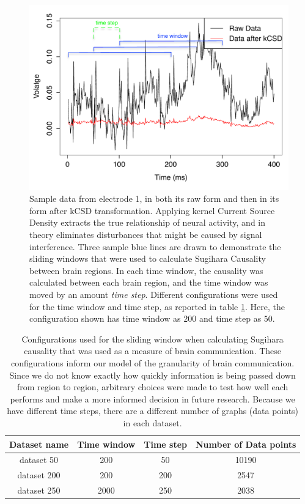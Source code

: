 \begin{figure}[H]
  \includegraphics[width=\linewidth]{figures/sample_eeg_signal_with_kcsd_edited.pdf}
  \caption{Sample data from electrode 1, in both its raw form and then in its form after kCSD transformation. Applying kernel Current Source Density extracts the true relationship of neural activity, and in theory eliminates disturbances that might be caused by signal interference. Three sample blue lines are drawn to demonstrate the sliding windows that were used to calculate Sugihara Causality between brain regions. In each time window, the causality was calculated between each brain region, and the time window was moved by an amount \textit{time step}. Different configurations were used for the time window and time step, as reported in table \ref{tab:sliding_window_configuration}. Here, the configuration shown has time window as $200$ and time step as $50$.}
  \label{fig:example_eeg_and_kcsd}
\end{figure}

\begin{table}[H]
\centering
\caption{Configurations used for the sliding window when calculating Sugihara causality that was used as a measure of brain communication. These configurations inform our model of the granularity of brain communication. Since we do not know exactly how quickly information is being passed down from region to region, arbitrary choices were made to test how well each performs and make a more informed decision in future research. Because we have different time steps, there are a different number of graphs (data points) in each dataset.}
\label{tab:sliding_window_configuration}
\begin{tabular}{|c|c|c|c|}
\hline
 Dataset name &  Time window &  Time step & Number of Data points\\ \hline
 
 dataset 50 & 200 & 50 & 10190 \\ \hline
 dataset 200 & 200 & 200 & 2547 \\ \hline
 dataset 250 & 2000 & 250 &  2038 \\ \hline
\end{tabular}
\end{table}

